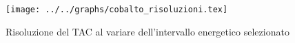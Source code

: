 \begin{figure}[h] \centering\texttt{[image: ../../graphs/cobalto\_risoluzioni.tex]}\caption{Risoluzione del TAC al variare dell'intervallo energetico selezionato}\label{gr:cobalto_risoluzioni} \end{figure}
